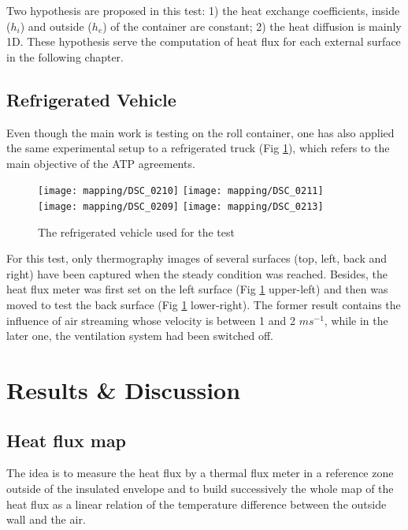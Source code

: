 Two hypothesis are proposed in this test: 1) the  heat exchange coefficients, inside ($h_i$) and outside ($h_e$) of the container are constant;\label{hyp1} 2) the heat diffusion is mainly 1D. These hypothesis serve the computation of heat flux for each external surface in the following chapter.

\subsection{Refrigerated Vehicle}

Even though the main work is testing on the roll container, one has also applied the same experimental setup to a refrigerated truck (Fig \ref{truck}), which refers to the main objective of the ATP agreements.
\begin{figure}[!htbp]
	\hspace{-10mm}
	\texttt{[image: mapping/DSC\_0210]}
	\texttt{[image: mapping/DSC\_0211]}\\
	
	\texttt{[image: mapping/DSC\_0209]}
	\texttt{[image: mapping/DSC\_0213]}
	\caption{The refrigerated vehicle used for the test}
	\label{truck}
\end{figure}

For this test, only thermography images of several surfaces (top, left, back and right) have been captured when the steady condition was reached. Besides, the heat flux meter was first set on the left surface (Fig \ref{truck} upper-left) and then was moved to test the back surface (Fig \ref{truck} lower-right). The former result contains the influence of air streaming whose velocity is between 1 and 2 $ms^{-1}$, while in the later one, the ventilation system had been switched off.

\section{Results \& Discussion}
\subsection{Heat flux map}
The idea is to measure the heat flux by a thermal flux meter in a reference zone outside of the insulated envelope and to build successively the whole map of the heat flux as a linear relation of the temperature difference between the outside wall and the air.

